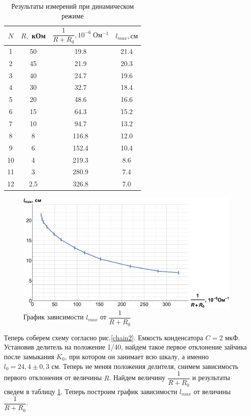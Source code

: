 \documentclass[12pt]{kiarticle}
\begin{document}
 \begin{table}[h]
	\centering
	\caption{Результаты измерений при динамическом режиме}
	\begin{tabular}{|c|c|c|c|}
		\hline
	$ N $ & $ R, $ кОм & $ \dfrac{1}{R+R_0}, 10^{-6}\; Ом^{-1} $& $ l_{max}, см $ \\
		\hline
		1 & 50 & 19.8 & 21.4 \\
		2 & 45 & 21.9 & 20.3 \\
		3 & 40 & 24.7 & 19.6 \\
		4 & 30 & 32.7 & 18.4 \\
		5 & 20 & 48.6 & 16.6 \\
		6 & 15 & 64.3 & 15.2 \\
		7 & 10 & 94.7 & 13.2 \\
		8 & 8 & 116.8 & 12.0 \\
		9 & 6 & 152.4 & 10.4 \\
		10 & 4 & 219.3 & 8.6 \\
		11 & 3 & 280.9 & 7.4 \\
		12 & 2.5 & 326.8 & 7.0  \\
		\hline
	\end{tabular}%
	\label{resL}%
\end{table}%

	 \begin{figure}[h!]
	\includegraphics[scale=0.5]{L.pdf}
	\caption{График зависимости $ l_{max} $ от $ \dfrac{1}{R + R_0} $}
\end{figure}

Теперь соберем схему согласно рис.\ref{chain2}. Емкость конденсатора $ C = 2  $ мкФ. Установив делитель на положение 1/40, найдем такое первое отклонение зайчика после замыкания $ K_0 $, при котором он занимает всю шкалу, а именно $ l_{0} =  24,4 \pm 0,3 $ см. Теперь не меняя положения делителя, снимем зависимость первого отклонения от величины $ R $.  Найдем величину $ \dfrac{1}{R + R_0} $ и результаты сведем в таблицу \ref{resL}. Теперь построим график зависимости $ l_{max} $ от величины $ \dfrac{1}{R + R_0} $.  
\end{document}
